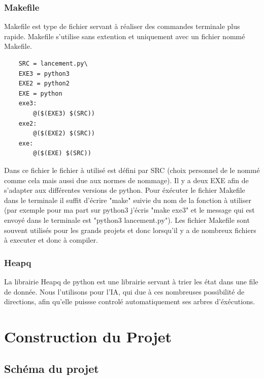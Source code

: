 \documentclass[a4paper,12pt]{article} %
\begin{document}
\subsubsection{Makefile}

Makefile est type de fichier servant à réaliser des commandes terminale plus rapide.
Makefile s'utilise sans extention et uniquement avec un fichier nommé Makefile.

\begin{lstlisting}
    SRC = lancement.py\
    EXE3 = python3
    EXE2 = python2
    EXE = python
    exe3:
        @($(EXE3) $(SRC))
    exe2:
        @($(EXE2) $(SRC))
    exe:
        @($(EXE) $(SRC))
\end{lstlisting}

Dans ce fichier le fichier à utilisé est défini par SRC (choix personnel de le nommé comme cela mais aussi due aux normes de nommage).
Il y a deux EXE afin de s'adapter aux différentes versions de python.
Pour éxécuter le fichier Makefile dans le terminale il suffit d'écrire "make" suivie du nom de la fonction à utiliser (par exemple pour ma part sur python3 j'écris "make exe3" et le message qui est envoyé dans le terminale est "python3 lancement.py").
Les fichier Makefile sont souvent utilisés pour les grands projets et donc lorsqu'il y a de nombreux fichiers à executer et donc à compiler.

\subsubsection{Heapq}

La librairie Heapq de python est une librairie servant à trier les état dans une file de donnée.
Nous l'utilisons pour l'IA, qui due à ces nombreuses possibilité de directions, afin qu'elle puissse controlé automatiquement ses arbres d'éxécutions.

\newpage

\section{Construction du Projet}

\subsection{Schéma du projet}

\setlength{\unitlength}{1mm}
\end{document}
